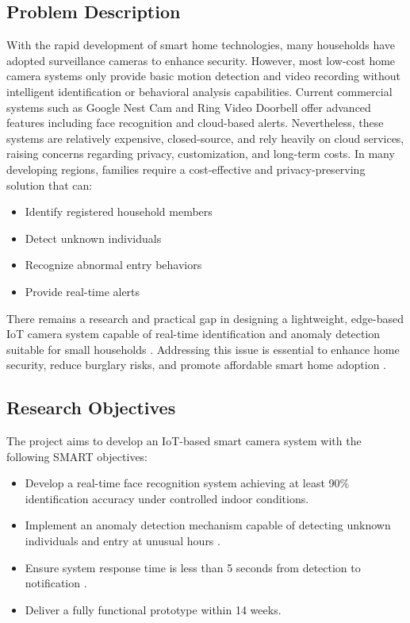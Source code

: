 \documentclass[12pt,a4paper]{article}
\begin{document}
\subsection{Problem Description}
With the rapid development of smart home technologies, many households have adopted surveillance cameras to enhance security. However, most low-cost home camera systems only provide basic motion detection and video recording without intelligent identification or behavioral analysis capabilities.
Current commercial systems such as Google Nest Cam and Ring Video Doorbell offer advanced features including face recognition and cloud-based alerts. Nevertheless, these systems are relatively expensive, closed-source, and rely heavily on cloud services, raising concerns regarding privacy, customization, and long-term costs.
In many developing regions, families require a cost-effective and privacy-preserving solution that can:
\begin{itemize}
    \item Identify registered household members
    \item Detect unknown individuals
    \item Recognize abnormal entry behaviors
    \item Provide real-time alerts
\end{itemize}
There remains a research and practical gap in designing a lightweight, edge-based IoT camera system capable of real-time identification and anomaly detection suitable for small households \cite{sarimole_2024}. Addressing this issue is essential to enhance home security, reduce burglary risks, and promote affordable smart home adoption \cite{ijacsa_2020}.

\subsection{Research Objectives}
The project aims to develop an IoT-based smart camera system with the following SMART objectives:
\begin{itemize}
    \item Develop a real-time face recognition system achieving at least 90\% identification accuracy under controlled indoor conditions.
    \item Implement an anomaly detection mechanism capable of detecting unknown individuals and entry at unusual hours \cite{facenet_2015}.
    \item Ensure system response time is less than 5 seconds from detection to notification \cite{gupta_edge_2020}.
    \item Deliver a fully functional prototype within 14 weeks.
\end{itemize}
\end{document}
